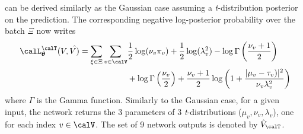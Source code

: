  can be derived similarly as the Gaussian case assuming a \textit{t}-distribution posterior on the prediction.
The corresponding negative log-posterior probability over the batch $\Xi$ now writes
\begin{equation}
    \begin{split}
    \ \calL_{\params}^{\calT}(V, \hat{V)} =
                         \sum_{\xi\in\Xi} \sum_{v\in \calV}
                        &    \dfrac{1}{2} \log (\nu_v\pi_v)
                           + \dfrac{1}{2} \log(\lambda_v^2)
                           - \log  \Gamma \left( \dfrac{\nu_v+1}{2} \right)\\
                        &  + \log  \Gamma \left( \dfrac{\nu_v}{2} \right)
                           + \dfrac{\nu_v+1}{2} \log \left( 1  + \dfrac{\powerOf{\mu_v - \tau_v)}}{\nu_v \lambda_v^2} \right)\\
    \end{split}
\end{equation}
where $\Gamma$ is the Gamma function.
Similarly to the Gaussian case, for a given input, the network returns the 3 parameters of 3 \textit{t}-distributions ($\mu_v, \nu_v, \lambda_v$), one for each index $v\in\calV$.
The set of 9 network outputs is denoted by $\hat{V}_{\calT}$.

